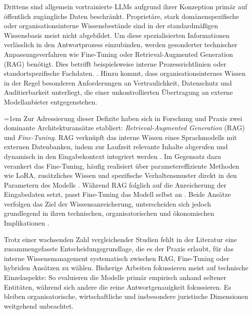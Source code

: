 Drittens sind allgemein vortrainierte LLMs aufgrund ihrer Konzeption primär auf öffentlich zugängliche Daten beschränkt. Proprietäre, stark domänenspezifische oder organisationsinterne Wissensbestände sind in der standardmäßigen Wissensbasis meist nicht abgebildet. Um diese spezialisierten Informationen verlässlich in den Antwortprozess einzubinden, werden gesonderter technischer Anpassungsverfahren wie Fine-Tuning oder Re\-trie\-val-Augmented Generation (RAG) benötigt.
Dies betrifft beispielsweise interne Prozessrichtlinien oder standortspezifische Fachdaten. \autocite[vgl.][1]{Balaguer.2024}. 
Hinzu kommt, dass organisationsinternes Wissen in der Regel besonderen Anforderungen an Vertraulichkeit, Datenschutz und Auditierbarkeit unterliegt, die einer unkontrollierten Übertragung an externe Modellanbieter entgegenstehen.

{\emergencystretch=1em
Zur Adressierung dieser Defizite haben sich in Forschung und Praxis zwei do\-mi\-nan\-te 
Architekturansätze etabliert: \textit{Retrieval-Augmented Generation} (RAG) 
und \textit{Fine-Tuning}. RAG verknüpft das interne Wissen eines 
Sprachmodells mit externen Datenbanken, indem zur Laufzeit relevante Inhalte 
abgerufen und dynamisch in den Eingabekontext integriert 
werden \autocites[vgl.][2]{Lewis.2020}[vgl.][1]{Gao.2024}. 
Im Gegensatz dazu verankert das Fine-Tuning, häufig realisiert über 
parametereffiziente Methoden wie LoRA, zusätzliches Wissen und spezifische 
Verhaltensmuster direkt in den Parametern des 
Modells \autocites[vgl.][1]{Hu.2022}[vgl.]{Song.2025}. 
Während RAG folglich auf die Anreicherung der Eingabedaten setzt, 
passt Fine-Tuning das Modell selbst an \autocite[vgl.][1]{Balaguer.2024}. 
Beide Ansätze verfolgen das Ziel der Wissensanreicherung, unterscheiden sich 
jedoch grundlegend in ihren technischen, organisatorischen und ökonomischen 
Implikationen \autocite[vgl.][29]{Balaguer.2024}.
\par}

Trotz einer wachsenden Zahl vergleichender Studien fehlt in der Literatur eine zusammengefasste Entscheidungsgrundlage, die es der Praxis erlaubt, für das interne Wissensmanagement systematisch zwischen RAG, Fine-Tuning oder hybriden Ansätzen zu wählen. Bisherige Arbeiten fokussieren meist auf technische Einzelaspekte: So evaluieren \textcite{Soudani.2024} die Modelle primär empirisch anhand seltener Entitäten, während sich andere die reine Antwortgenauigkeit fokussieren. \autocite[vgl.][2]{Ovadia.2024}
Es bleiben organisatorische, wirtschaftliche und insbesondere juristische Dimensionen weitgehend 
unbeachtet.

